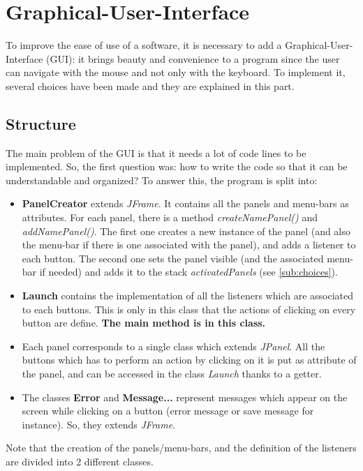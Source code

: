 \section{Graphical-User-Interface}
To improve the ease of use of a software, it is necessary to add a Graphical-User-Interface (GUI): it brings beauty and convenience to a program since the user can navigate with the mouse and not only with the keyboard. To implement it, several choices have been made and they are explained in this part.
\subsection{Structure}
\label{sub:structure}
The main problem of the GUI is that it needs a lot of code lines to be implemented. So, the first question was: how to write the code so that it can be understandable and organized?
To answer this, the program is split into:
\begin{itemize}
	\item{\textbf{PanelCreator}} extends \textit{JFrame}. It contains all the panels and menu-bars as attributes. For each panel, there is a method \textit{createNamePanel()} and \textit{addNamePanel()}. The first one creates a new instance of the panel (and also the menu-bar if there is one associated with the panel), and adds a listener to each button. The second one sets the panel visible (and the associated menu-bar if needed) and adds it to the stack \textit{activatedPanels} (see \ref{sub:choices}).
	\item{\textbf{Launch}} contains the implementation of all the listeners which are associated to each buttons. This is only in this class that the actions of clicking on every button are define. \textbf{The main method is in this class.}
	\item Each panel corresponds to a single class which extends \textit{JPanel}. All the buttons which has to perform an action by clicking on it is put as attribute of the panel, and can be accessed in the class \textit{Launch} thanks to a getter.
	\item The classes \textbf{Error} and \textbf{Message...} represent messages which appear on the screen while clicking on a button (error message or save message for instance). So, they extends \textit{JFrame}.
\end{itemize}
Note that the creation of the panels/menu-bars, and the definition of the listeners are divided into 2 different classes.

